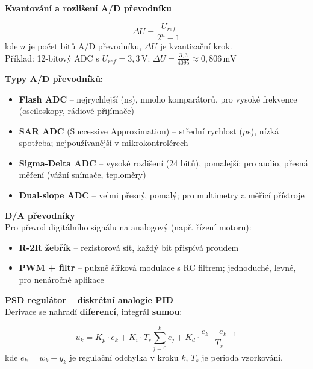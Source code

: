 \documentclass[a4paper,10pt]{article}
\begin{document}
\begin{vysvetlenibox}
\textbf{Kvantování a rozlišení A/D převodníku}

\begin{vzorcebox}
$$\Delta U = \frac{U_{ref}}{2^n - 1}$$
kde $n$ je počet bitů A/D převodníku, $\Delta U$ je kvantizační krok.\\
Příklad: 12-bitový ADC s $U_{ref} = 3{,}3\,\text{V}$:
$\Delta U = \frac{3{,}3}{4095} \approx 0{,}806\,\text{mV}$
\end{vzorcebox}

\textbf{Typy A/D převodníků:}
\begin{itemize}[noitemsep, leftmargin=1.4em, topsep=4pt]
    \item \textbf{Flash ADC} -- nejrychlejší (ns), mnoho komparátorů,
          pro vysoké frekvence (osciloskopy, rádiové přijímače)
    \item \textbf{SAR ADC} (Successive Approximation) -- střední rychlost ($\mu$s),
          nízká spotřeba; nejpoužívanější v mikrokontrolérech
    \item \textbf{Sigma-Delta ADC} -- vysoké rozlišení (24 bitů), pomalejší;
          pro audio, přesná měření (vážní snímače, teploměry)
    \item \textbf{Dual-slope ADC} -- velmi přesný, pomalý;
          pro multimetry a měřicí přístroje
\end{itemize}

\textbf{D/A převodníky}\\
Pro převod digitálního signálu na analogový (např. řízení motoru):
\begin{itemize}[noitemsep, leftmargin=1.4em, topsep=4pt]
    \item \textbf{R-2R žebřík} -- rezistorová síť, každý bit přispívá proudem
    \item \textbf{PWM + filtr} -- pulzně šířková modulace s RC filtrem;
          jednoduché, levné, pro nenáročné aplikace
\end{itemize}

\textbf{PSD regulátor -- diskrétní analogie PID}\\
Derivace se nahradí \textbf{diferencí}, integrál \textbf{sumou}:

\begin{vzorcebox}
$$u_k = K_p \cdot e_k
+ K_i \cdot T_s \sum_{j=0}^{k} e_j
+ K_d \cdot \frac{e_k - e_{k-1}}{T_s}$$
kde $e_k = w_k - y_k$ je regulační odchylka v kroku $k$,
$T_s$ je perioda vzorkování.
\end{vzorcebox}


\end{vysvetlenibox}
\end{document}
